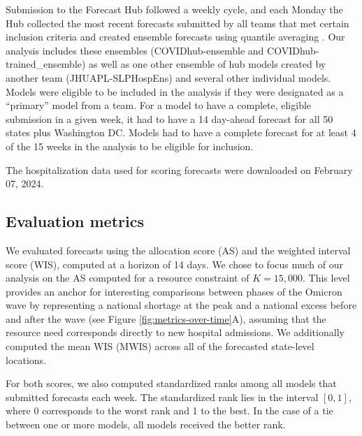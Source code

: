 \documentclass{article}\usepackage[]{graphicx}\usepackage[]{xcolor}
\begin{document}
Submission to the Forecast Hub followed a weekly cycle, and each Monday the Hub collected the most recent forecasts
submitted by all teams that met certain inclusion criteria and created ensemble forecasts using quantile averaging
\citep{ray_comparing_2023}. Our analysis includes these ensembles (COVIDhub-ensemble and COVIDhub-trained\_ensemble) as
well as one other ensemble of hub models created by another team (JHUAPL-SLPHospEns) and several other individual
models. Models were eligible to be included in the analysis if they were designated as a ``primary'' model from a team.
For a model to have a complete, eligible submission in a given week, it had to have a 14 day-ahead forecast for all 50
states plus Washington DC. Models had to have a complete forecast for at least 4 of the 15 weeks in the analysis to be
eligible for inclusion.



The hospitalization data used for scoring forecasts were downloaded on February 07, 2024.

\subsection{Evaluation metrics}

We evaluated forecasts using the allocation score (AS) and the weighted interval score (WIS), computed at a horizon of
14 days. We chose to focus much of our analysis on the AS computed for a resource constraint of $K=15,000$. This level provides
an anchor for interesting comparisons between phases of the Omicron wave by representing a national shortage at the peak and
a national excess before and after the wave (see Figure \ref{fig:metrics-over-time}A), assuming that the resource need corresponds 
directly to new hospital admissions.
We additionally computed the mean
WIS (MWIS) across all of the forecasted state-level locations. 

For both scores, we also computed standardized ranks among all models that submitted forecasts each week. The
standardized rank lies in the interval $[0, 1]$, where 0 corresponds to the worst rank and 1 to the best. In the case of
a tie between one or more models, all models received the better rank.
\end{document}
